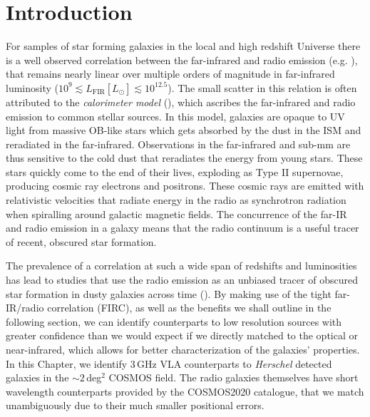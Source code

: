 \sloppy

\section{Introduction}

For samples of star forming galaxies in the local and high redshift Universe there is a well observed correlation between the far-infrared and radio emission (e.g. \citealt{Dickey_1984, deJong_1985, Helou_1985, Condon_1992, Barger_2000, Yun_2001, Garrett_2002, Appleton_2004, Ibar_2008, Seymour_2009, Sargent_2010}), that remains nearly linear over multiple orders of magnitude in far-infrared luminosity ($10^{9} \lesssim L_{\textrm{FIR}} [L_{\odot}] \lesssim 10^{12.5}$). The small scatter in this relation is often attributed to the \textit{calorimeter model} (\citealt{Voelk_1989, Lisenfeld_1996, Lacki_2010}), which ascribes the far-infrared and radio emission to common stellar sources. In this model, galaxies are opaque to UV light from massive OB-like stars which gets absorbed by the dust in the ISM and reradiated in the far-infrared. Observations in the far-infrared and sub-mm are thus sensitive to the cold dust that reradiates the energy from young stars. These stars quickly come to the end of their lives, exploding as Type II supernovae, producing cosmic ray electrons and positrons. These cosmic rays are emitted with relativistic velocities that radiate energy in the radio as synchrotron radiation when spiralling around galactic magnetic fields. The concurrence of the far-IR and radio emission in a galaxy means that the radio continuum is a useful tracer of recent, obscured star formation.

The prevalence of a correlation at such a wide span of redshifts and luminosities has lead to studies that use the radio emission as an unbiased tracer of obscured star formation in dusty galaxies across time (\citealt{Kennicutt_2012}). By making use of the tight far-IR/radio correlation (FIRC), as well as the benefits we shall outline in the following section, we can identify counterparts to low resolution sources with greater confidence than we would expect if we directly matched to the optical or near-infrared, which allows for better characterization of the galaxies' properties. In this Chapter, we identify $3\,$GHz VLA counterparts to \textit{Herschel} detected galaxies in the $\sim2\,$deg$^2$ COSMOS field. The radio galaxies themselves have short wavelength counterparts provided by the COSMOS2020 catalogue, that we match unambiguously due to their much smaller positional errors.


